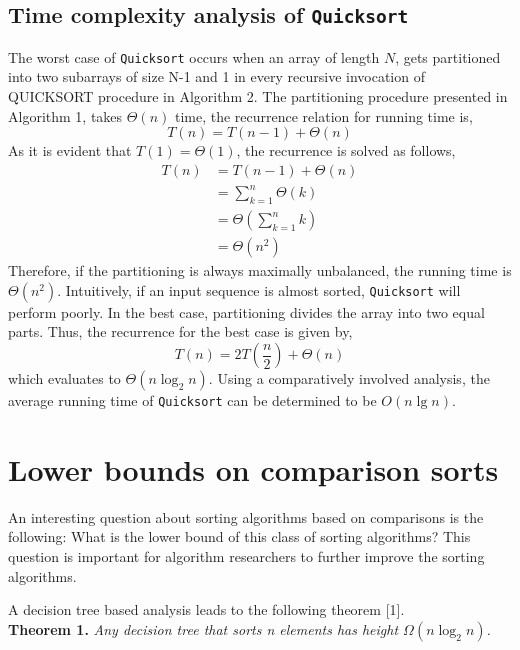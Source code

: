 \documentclass[a4paper, 10pt, twocolumn]{article}
\begin{document}
\subsection{Time complexity analysis of \texttt{Quicksort}}

The worst case of \texttt{Quicksort} occurs when an array of length $N$, gets partitioned into two subarrays of size N-1 and 1 in every recursive invocation of QUICKSORT procedure in Algorithm 2. The partitioning procedure presented in Algorithm 1, takes $\Theta(n)$ time, the recurrence relation for running time is,
$$T(n)=T(n-1)+\Theta(n)$$
As it is evident that $T(1)=\Theta(1)$, the recurrence is solved as follows,
\begin{align*}
    T(n) &= T(n-1)+\Theta(n)\\
    &=\sum_{k=1}^{n}\Theta(k)\\
    &=\Theta\left (\sum_{k=1}^{n}k\right )\\
    &=\Theta(n^2)
\end{align*}
Therefore, if the partitioning is always maximally unbalanced,
the running time is $\Theta(n^2)$. Intuitively, if an input sequence is almost sorted, \texttt{Quicksort} will perform poorly. In the best case, partitioning divides the array into two equal parts. Thus, the recurrence for the best case is given by,
$$T(n) = 2T\left ( \frac{n}{2}\right )+\Theta(n)$$
which evaluates to $\Theta(n\log_2{n})$. Using a comparatively involved analysis, the average running time of \texttt{Quicksort} can be determined to be $O(n\lg{n})$.

\section{Lower bounds on comparison sorts}
An interesting question about sorting algorithms based on comparisons is the following: What is the lower bound of this class of sorting algorithms? This question is important for algorithm researchers to further improve the sorting algorithms.
\par A decision tree based analysis leads to the following theorem [1].\\[6pt]
\textbf{Theorem 1. }\textit{Any decision tree that sorts n elements has height $\Omega(n\log_2{n})$.}
\end{document}
